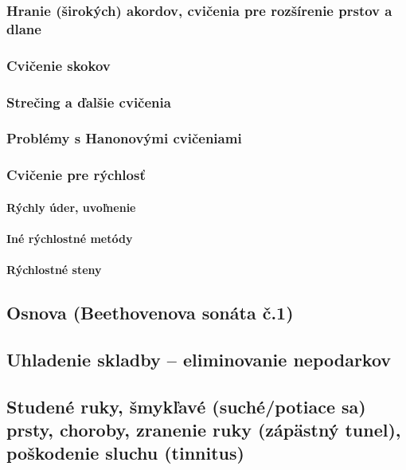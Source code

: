 \subsubsection{Hranie (širokých) akordov, cvičenia pre rozšírenie prstov a dlane}

\subsubsection{Cvičenie skokov}

\subsubsection{Strečing a ďalšie cvičenia}

\subsubsection{Problémy s Hanonovými cvičeniami}

\subsubsection{Cvičenie pre rýchlosť}

\paragraph{Rýchly úder, uvoľnenie}

\paragraph{Iné rýchlostné metódy} 

\paragraph{Rýchlostné steny} 

\subsection{Osnova (Beethovenova sonáta č.1)}

\subsection{Uhladenie skladby – eliminovanie nepodarkov}

\subsection{Studené ruky, šmykľavé (suché/potiace sa) prsty, choroby, zranenie ruky (zápästný tunel), 
poškodenie sluchu (tinnitus)}

